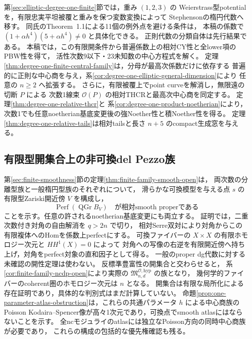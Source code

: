 \documentclass[a4paper,11pt]{ltjsarticle}
\numberwithin{equation}{section}
\theoremstyle{plain}
\theoremstyle{definition}
\theoremstyle{remark}
\newcommand{\OO}{\mathcal O}
\newcommand{\QGr}{\operatorname{QGr}}
\begin{document}
第\ref{sec:elliptic-degree-one-finite}節では，重み $(1,2,3)$ の
Weierstrass型potentialを，有限忠実平坦被覆と重みを保つ変数変換によって
Stephensonの楕円代数へ移す。
同氏のTheorem~1.1\cite{Stephenson1997}による11個の例外点を避ける条件は，
本稿の係数で $(1+\alpha h^4)(5+\alpha h^4)\ne0$ と具体化できる。
正則代数の分類自体は先行結果である。
本稿では，この有限開条件から普遍係数上の相対CY性と全lower項のPBW性を得て，
活性次数9以下・23未知数の中心方程式を解く。
定理\ref{thm:degree-one-finite-central-family}は，分母が最高次係数だけに依存する
普遍的に正則な中心商を与え，系\ref{cor:degree-one-elliptic-general-dimension}により
任意の $n\ge2$ へ拡張する。
さらに，有限被覆上でpoint curveを解消し，無限遠の切断 $P$ による
次数1線束 $\mathcal O(P)$ の相対THCRと最高次中心商を同定する。
定理\ref{thm:degree-one-relative-thcr}と
系\ref{cor:degree-one-product-noetherian}により，
次数1でも任意noetherian基底変更後の強Noether性と積Noether性を得る。
定理\ref{thm:degree-one-relative-tails}は相対tailsと長さ $n+5$ のcompact生成窓を与える。

\subsection{有限型開集合上の非可換del Pezzo族}
第\ref{sec:finite-smoothness}節の定理\ref{thm:finite-family-smooth-open}は，
両次数の分離型族と一般楕円型族のそれぞれについて，
滑らかな可換模型を与える点 $s$ の有限型Zariski開近傍 $V$ を構成し，
\[
 \operatorname{Perf}(\QGr B_V)\quad\text{が相対smooth properである}
\]
ことを示す。任意の許されるnoetherian基底変更にも両立する。
証明では，二重次数付き対角の自由解消を $q>2n$ で切り，
相対Serre双対により対角からこの有限複体へのHomを係数上perfectにする。
可換ファイバーの $X\times X$ の有限ホモロジー次元と $HH^1(X)=0$ によって
対角への写像の右逆を有限開近傍へ持ち上げ，対角をperfect対象の直和因子として得る。
一般のproper dg代数に対する未確認の開性定理は使わない。
反標準豊富性の開集合と交わらせると，
系\ref{cor:finite-family-ncdp-open}により実際の
$\mathfrak M^{\OO,\mathrm{hyp}}_{n,d}$ の族となり，
幾何学的ファイバーのcoherent圏のホモロジー次元は $n$ となる。
開集合は有限な局所化による存在証明であり，具体的な判別式はまだ計算していない。
命題\ref{prop:one-parameter-atlas-obstruction}は，これらの共通パラメータ $h$ による中心商族の
Poisson Kodaira--Spencer像が高々1次元であり，可換点でsmooth atlasにはならないことを示す。
全ncモジュライのatlasには独立なPoisson方向の同時中心商族が必要であり，
これらの構成の包括的な優先権確認も残る。
\end{document}
